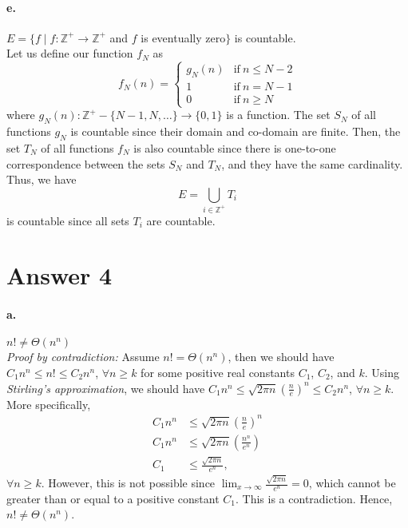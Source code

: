 \documentclass[11pt]{article}
\begin{document}
\paragraph{e.} $E = \{f \mid f: \mathbb{Z}^+ \rightarrow \mathbb{Z}^+$ and $f$ is eventually zero$\}$ is countable. \\
Let us define our function $f_N$ as
\[
    f_N (n) =
    \begin{cases}
        g_N (n) & \text{if} \ n \le N - 2 \\
        1 & \text{if} \ n = N - 1 \\
        0 & \text{if} \ n \ge N
    \end{cases}
\]
where $g_N (n) : \mathbb{Z}^+ - \{N - 1, N, \dots \} \rightarrow \{0, 1\}$ is a function. The set $S_N$ of all functions $g_N$ is countable since their domain and co-domain are finite. Then, the set $T_N$ of all functions $f_N$ is also countable since there is one-to-one correspondence between the sets $S_N$ and $T_N$, and they have the same cardinality. Thus, we have
\[
    E = \bigcup_{i \in \mathbb{Z}^+} T_i
\]
is countable since all sets $T_i$ are countable.

\newpage
\section*{Answer 4}
\paragraph{a.} $n! \neq \Theta(n^n)$ \\

\noindent \textit{Proof by contradiction:} Assume $n! = \Theta(n^n)$, then we should have $C_1 n^n \le n! \le C_2 n^n$, $\forall n \ge k$ for some positive real constants $C_1$, $C_2$, and $k$. Using \textit{Stirling's approximation}, we should have $C_1 n^n \le \sqrt{2 \pi n} \left( \frac{n}{e} \right)^n \le C_2 n^n$, $\forall n \ge k$. More specifically,
\begin{align*}
    C_1 n^n &\le \sqrt{2 \pi n} \left( \frac{n}{e} \right)^n \\
    C_1 n^n &\le \sqrt{2 \pi n} \left( \frac{n^n}{e^n} \right) \\
    C_1 &\le \frac{\sqrt{2 \pi n}}{e^n},
\end{align*}
$\forall n \ge k$. However, this is not possible since $\lim_{x \rightarrow \infty} \frac{\sqrt{2 \pi n}}{e^n} = 0$, which cannot be greater than or equal to a positive constant $C_1$. This is a contradiction. Hence, $n! \neq \Theta(n^n)$. \\
\end{document}
